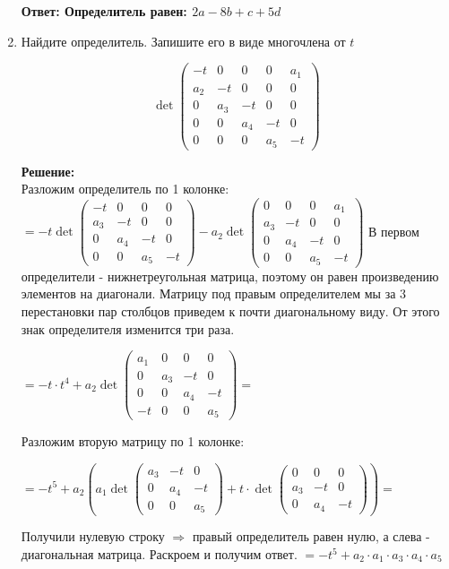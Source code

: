 \documentclass[a4paper,12pt]{article}
\begin{document}
\begin{enumerate}
\textbf{Ответ: Определитель равен: $2a-8b+c+5d$}
\item Найдите определитель. Запишите его в виде многочлена от $t$

$$
\det\begin{pmatrix}
-t&0&0&0&a_1\\
a_2&-t&0&0&0\\
0&a_3&-t&0&0\\
0&0&a_4&-t&0\\
0&0&0&a_5&-t
\end{pmatrix}
$$

\vspace{5pt}
\textbf{Решение:}\\
Разложим определитель по 1 колонке:
$=-t \det \begin{pmatrix}
-t&0&0&0\\
a_3&-t&0&0\\
0&a_4&-t&0\\
0&0&a_5&-t
\end{pmatrix} - a_2 \det \begin{pmatrix}
0&0&0&a_1\\
a_3&-t&0&0\\
0&a_4&-t&0\\
0&0&a_5&-t
\end{pmatrix}$ 
В первом определители - нижнетреугольная матрица, поэтому он равен произведению элементов на диагонали. Матрицу под правым определителем мы за 3 перестановки пар столбцов приведем к почти диагональному виду. От этого знак определителя изменится три раза.

$=-t \cdot t^4 + a_2 \det \begin{pmatrix}
a_1&0&0&0\\
0&a_3&-t&0\\
0&0&a_4&-t\\
-t&0&0&a_5
\end{pmatrix}=$

Разложим вторую матрицу по 1 колонке:

$=-t^5+a_2(a_1 \det \begin{pmatrix}
a_3&-t&0\\
0&a_4&-t\\
0&0&a_5
\end{pmatrix} +t \cdot \det \begin{pmatrix}
0&0&0\\
a_3&-t&0\\
0&a_4&-t
\end{pmatrix})=$ 

Получили нулевую строку $\Rightarrow$ правый определитель равен нулю, а слева - диагональная матрица.
Раскроем и получим ответ.
$=-t^5+a_2 \cdot a_1 \cdot a_3 \cdot a_4 \cdot a_5$



\end{enumerate}
\end{document}
